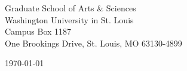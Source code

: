 \begin{minipage}{0.49\textwidth}
\begin{flushleft}
\noindent 
Graduate School of Arts \& Sciences \\
Washington University in St. Louis \\
Campus Box 1187 \\
One Brookings Drive, St. Louis, MO 63130-4899
\end{flushleft}
\end{minipage}
\begin{minipage}{0.47\textwidth}
\begin{flushright}
\today
\end{flushright}
\end{minipage} \\

\newcommand{\univ}{Washington University in St. Louis}
\newcommand{\univshort}{WUSTL}
\newcommand{\degree}{Ph.D.}
\newcommand{\dept}{Computer Science}
